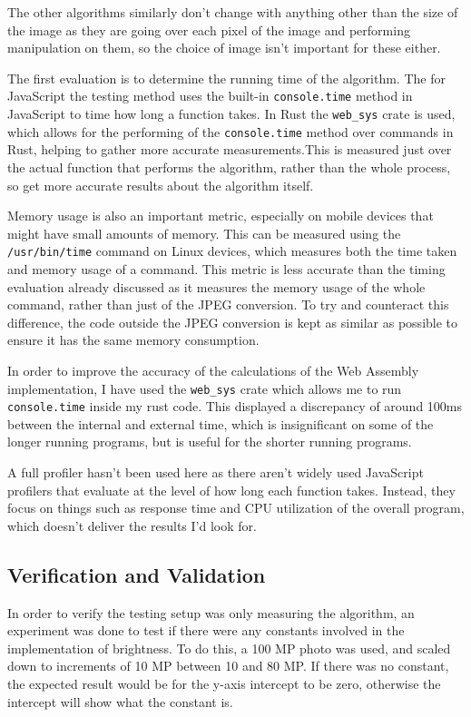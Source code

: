 \documentclass[12pt,a4paper]{article}
\begin{document}
The other algorithms similarly don't change with anything other than the size of the image as they are going over each pixel of the image and performing manipulation on them, so the choice of image isn't important for these either.

The first evaluation is to determine the running time of the algorithm. The for JavaScript the testing method uses the built-in \texttt{console.time} method in JavaScript to time how long a function takes. In Rust the \texttt{web\_sys} crate is used, which allows for the performing of the \texttt{console.time} method over commands in Rust, helping to gather more accurate measurements.This is measured just over the actual function that performs the algorithm, rather than the whole process, so get more accurate results about the algorithm itself.

Memory usage is also an important metric, especially on mobile devices that might have small amounts of memory. This can be measured using the \texttt{/usr/bin/time} command on Linux devices, which measures both the time taken and memory usage of a command. This metric is less accurate than the timing evaluation already discussed as it measures the memory usage of the whole command, rather than just of the JPEG conversion. To try and counteract this difference, the code outside the JPEG conversion is kept as similar as possible to ensure it has the same memory consumption.

In order to improve the accuracy of the calculations of the Web Assembly implementation, I have used the \texttt{web\_sys} crate which allows me to run \texttt{console.time} inside my rust code. This displayed a discrepancy of around 100ms between the internal and external time, which is insignificant on some of the longer running programs, but is useful for the shorter running programs.

A full profiler hasn't been used here as there aren't widely used JavaScript profilers that evaluate at the level of how long each function takes. Instead, they focus on things such as response time and CPU utilization of the overall program, which doesn't deliver the results I'd look for.

\subsection{Verification and Validation}

In order to verify the testing setup was only measuring the algorithm, an experiment was done to test if there were any constants involved in the implementation of brightness. To do this, a 100 MP photo was used, and scaled down to increments of 10 MP between 10 and 80 MP. If there was no constant, the expected result would be for the y-axis intercept to be zero, otherwise the intercept will show what the constant is.
\end{document}
